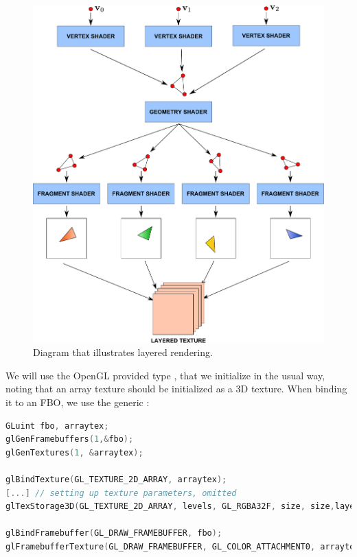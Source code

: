 \begin{figure}[!ht]
\centering
\includegraphics[width=\linewidth]{images/method/layered.pdf}
\caption{Diagram that illustrates layered rendering.}
\label{fig:step3}
\end{figure} 

We will use the OpenGL provided type , that we initialize in the usual way, noting that an array texture should be initialized as a 3D texture. When binding it to an FBO, we use the generic :

\begin{lstlisting}[language=C++,label=lst:initarraytexture,caption={Initializing array texture. Note that the number of layers is passed to the \gl{glTexStorage3D} command.}]
GLuint fbo, arraytex;
glGenFramebuffers(1,&fbo);
glGenTextures(1, &arraytex);

glBindTexture(GL_TEXTURE_2D_ARRAY, arraytex);
[...] // setting up texture parameters, omitted
glTexStorage3D(GL_TEXTURE_2D_ARRAY, levels, GL_RGBA32F, size, size,layers);

glBindFramebuffer(GL_DRAW_FRAMEBUFFER, fbo);
glFramebufferTexture(GL_DRAW_FRAMEBUFFER, GL_COLOR_ATTACHMENT0, arraytex, 0);
\end{lstlisting}

